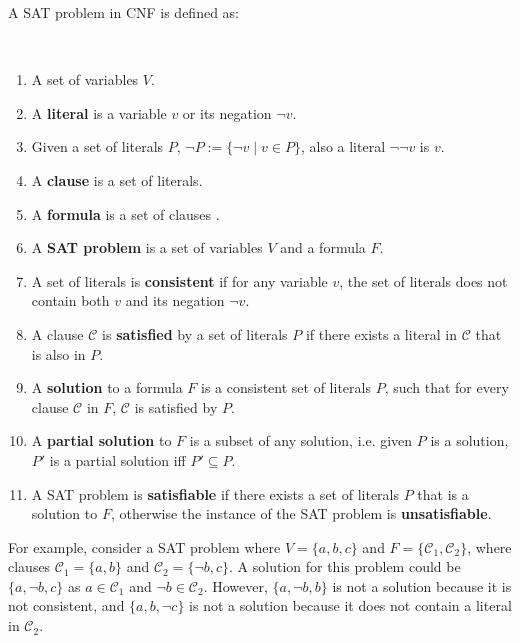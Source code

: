 A SAT problem in CNF is defined as:
\begin{defs}
\label{impl.defSAT}
{\ }
\begin{enumerate}
    \item A set of variables $V$.
    \item A \textbf{literal} is a variable $v$ or its negation $\neg v$.
    \item Given a set of literals $P$, $\neg P := \{\neg v \mid v \in P\}$, also a literal $\neg \neg v$ is $v$.
    \item A \textbf{clause} is a set of literals.
    \item A \textbf{formula} is a set of clauses \label{impl.whatisaformula}.
    \item A \textbf{SAT problem} is a set of variables $V$ and a formula $F$.
    \item A set of literals is \textbf{consistent} if for any variable $v$, the set of literals does not contain both $v$ and its negation $\neg v$.
    \item A clause $\mathcal{C}$ is \textbf{satisfied} by a set of literals $P$ if there exists a literal in $\mathcal{C}$ that is also in $P$.
    \item A \textbf{solution} to a formula $F$ is a consistent set of literals $P$, such that for every clause $\mathcal{C}$ in $F$, $\mathcal{C}$ is satisfied by $P$.
    \item A \textbf{partial solution} to $F$ is a subset of any solution, i.e. given $P$ is a solution, $P'$ is a partial solution iff $P' \subseteq P$.
    \item A SAT problem is \textbf{satisfiable} if there exists a set of literals $P$ that is a solution to $F$, otherwise the instance of the SAT problem is \textbf{unsatisfiable}. 
\end{enumerate}
\end{defs}

For example, consider a SAT problem where $V = \{a,b,c\}$ and $F = \{\mathcal{C}_1,\mathcal{C}_2\}$, where clauses $\mathcal{C}_1 = \{a,b\}$ and $\mathcal{C}_2 = \{\neg b, c\}$.
A solution for this problem could be $\{a,\neg b,c\}$ as $a \in \mathcal{C}_1$ and $\neg b \in \mathcal{C}_2$.
However, $\{a, \neg b, b\}$ is not a solution because it is not consistent, and $\{a, b, \neg c\}$ is not a solution because it does not contain a literal in $\mathcal{C}_2$.  


